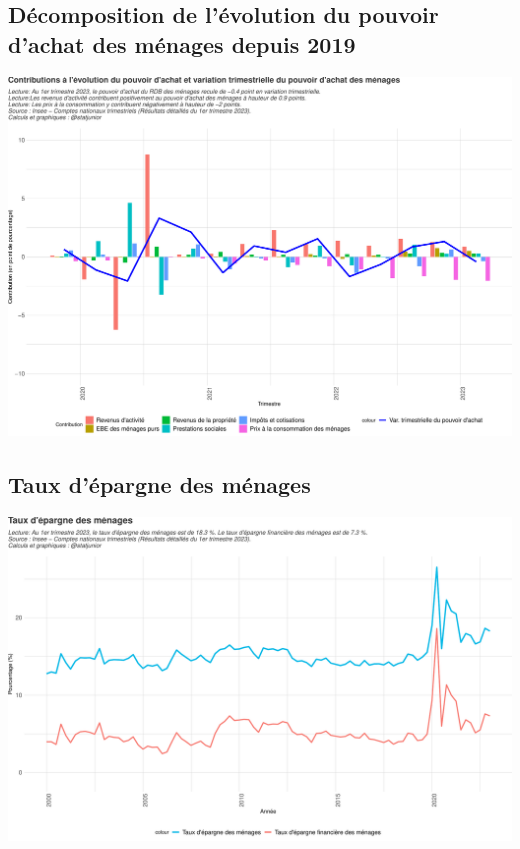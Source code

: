 \documentclass[
  paper=a4,
  ,captions=tableheading
]{scrartcl}
\begin{document}
\hypertarget{duxe9composition-de-luxe9volution-du-pouvoir-dachat-des-muxe9nages-depuis-2019}{%
\subsection{Décomposition de l'évolution du pouvoir d'achat des ménages
depuis
2019}\label{duxe9composition-de-luxe9volution-du-pouvoir-dachat-des-muxe9nages-depuis-2019}}

\includegraphics{rapport_pdf_csi_files/figure-latex/unnamed-chunk-4-1.pdf}

\hypertarget{taux-duxe9pargne-des-muxe9nages}{%
\subsection{Taux d'épargne des
ménages}\label{taux-duxe9pargne-des-muxe9nages}}

\includegraphics{rapport_pdf_csi_files/figure-latex/unnamed-chunk-5-1.pdf}
\end{document}
